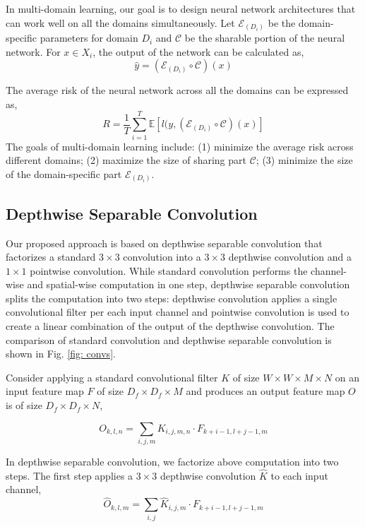\documentclass[letterpaper]{article} \usepackage{aaai19}  \usepackage{times}  \usepackage{helvet}  \usepackage{courier}  \usepackage{url}  \usepackage{graphicx}  \usepackage{amssymb}
\begin{document}
In multi-domain learning, our goal is to design neural network architectures that can work well on all the domains simultaneously. Let $\mathcal{E}_{(D_i)}$ be the domain-specific parameters for domain $D_i$ and $\mathcal{C}$ be the sharable portion of the neural network. For $x \in X_i$, the output of the network can be calculated as,
\begin{equation}
    \hat{y} = (\mathcal{E}_{(D_i)} \circ \mathcal{C})(x)
\end{equation}

The average risk of the neural network across all the domains can be expressed as,
\begin{equation}
    R = \frac{1}{T}\sum_{i=1}^{T} \mathbb{E}[l(y,(\mathcal{E}_{(D_i)} \circ \mathcal{C})(x)]
\end{equation}
The goals of multi-domain learning include: (1) minimize the average risk across different domains; (2) maximize the size of sharing part $\mathcal{C}$; (3) minimize the size of the domain-specific part $\mathcal{E}_{(D_i)}$.

\subsection{Depthwise Separable Convolution}
Our proposed approach is based on depthwise separable convolution that factorizes a standard $3 \times 3$ convolution into a $3 \times 3$ depthwise
convolution and a $1\times1$ pointwise convolution. While standard convolution performs the channel-wise and spatial-wise computation in one step, depthwise separable convolution splits the computation into two steps: depthwise convolution applies a single convolutional filter per each input channel and pointwise convolution is used to create a linear combination of the output of the depthwise convolution. The comparison of standard convolution and depthwise separable convolution is shown in Fig. \ref{fig: convs}.

Consider applying a standard convolutional filter $K$ of size $W \times W \times M \times N$ on an input feature map $F$ of size $D_f \times D_f \times M$ and produces an output feature map $O$ is of size $D_f \times D_f \times N$,

\begin{equation}
    O_{k,l,n} = \sum_{i,j,m}K_{i,j,m,n} \cdot F_{k+i-1, l+j-1,m}
\end{equation}

In depthwise separable convolution, we factorize above computation into two steps. The first step applies a $3 \times 3$ depthwise
convolution $\hat{K}$ to each input channel,
\begin{equation}
    \hat{O}_{k,l,m} = \sum_{i,j}\hat{K}_{i,j,m} \cdot F_{k+i-1, l+j-1,m}
\end{equation}
\end{document}
